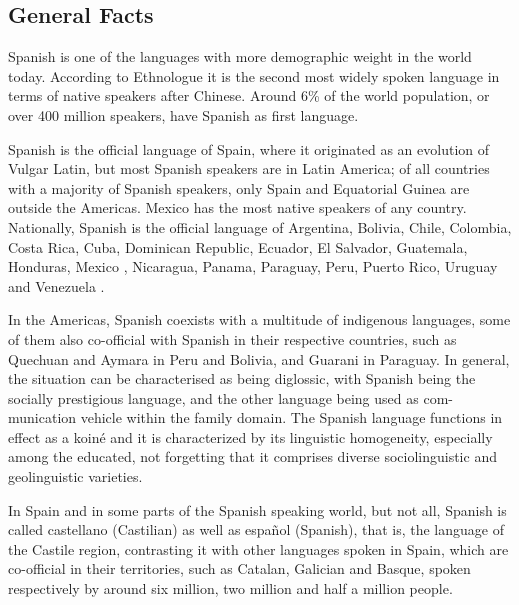 \clearpage


\begin{multicols}{2}

\subsection{General Facts}

Spanish is one of the languages with more demographic weight in the world today. According to Ethnologue \cite{ethnologue} it is the second most widely spoken language in terms of native speakers after Chinese. Around 6\% of the world population, or over 400 million speakers, have Spanish as first language.

Spanish is the official language of Spain, where it originated as an evolution of Vulgar Latin, but most Spanish speakers are in Latin America; of all countries with a majority of Spanish speakers, only Spain and Equatorial Guinea are outside the Americas. Mexico has the most native speakers of any country. Nationally, Spanish is the official language of Argentina, Bolivia, Chile, Colombia, Costa Rica, Cuba, Dominican Republic, Ecuador, El Salvador, Guatemala, Honduras, Mexico , Nicaragua, Panama, Paraguay, Peru, Puerto Rico, Uruguay and Venezuela \cite{atlasspanish}.


In the Americas, Spanish coexists with a multitude of indigenous languages, some of them also co-official with Spanish in their respective countries, such as Quechuan and Aymara in Peru and Bolivia, and Guarani in Paraguay. In general, the situation can be characterised as being diglossic, with Spanish being the socially prestigious language, and the other language being used as com-munication vehicle within the family domain. The Spanish language functions in effect as a koiné and it is characterized by its linguistic homogeneity, especially among the educated, not forgetting that it comprises diverse sociolinguistic and geolinguistic varieties.

In Spain and in some parts of the Spanish speaking world, but not all, Spanish is called castellano (Castilian) as well as español (Spanish), that is, the language of the Castile region, contrasting it with other languages spoken in Spain, which are co-official in their territories, such as Catalan, Galician and Basque, spoken respectively by around six million, two million and half a million people. 


\end{multicols}
